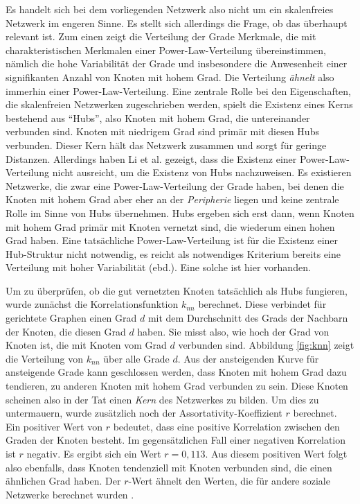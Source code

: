 Es handelt sich bei dem vorliegenden Netzwerk also nicht um ein
skalenfreies Netzwerk im engeren Sinne. Es stellt sich allerdings die
Frage, ob das überhaupt relevant ist. Zum einen zeigt die Verteilung
der Grade Merkmale, die mit charakteristischen Merkmalen einer
Power-Law-Verteilung übereinstimmen, nämlich die hohe
Variabilität der Grade und insbesondere die Anwesenheit einer
signifikanten Anzahl von Knoten mit hohem Grad. Die Verteilung
\emph{ähnelt} also immerhin einer Power-Law-Verteilung. Eine
zentrale Rolle bei den Eigenschaften, die skalenfreien Netzwerken
zugeschrieben werden, spielt die Existenz eines Kerns bestehend aus
``Hubs'', also Knoten mit hohem Grad, die untereinander verbunden
sind. Knoten mit niedrigem Grad sind primär mit diesen Hubs
verbunden. Dieser Kern hält das Netzwerk zusammen und sorgt für
geringe Distanzen. Allerdings haben Li et al. \cite{Li2005} gezeigt,
dass die Existenz einer Power-Law-Verteilung nicht ausreicht, um die
Existenz von Hubs nachzuweisen. Es existieren Netzwerke, die zwar eine
Power-Law-Verteilung der Grade haben, bei denen die Knoten mit hohem
Grad aber eher an der \emph{Peripherie} liegen und keine zentrale
Rolle im Sinne von Hubs übernehmen.  Hubs ergeben sich erst dann,
wenn Knoten mit hohem Grad primär mit Knoten vernetzt sind, die
wiederum einen hohen Grad haben. Eine tatsächliche
Power-Law-Verteilung ist für die Existenz einer Hub-Struktur nicht
notwendig, es reicht als notwendiges Kriterium bereits eine Verteilung
mit hoher Variabilität (ebd.). Eine solche ist hier vorhanden.

Um zu überprüfen, ob die gut vernetzten Knoten tatsächlich als
Hubs fungieren, wurde zunächst die Korrelationsfunktion $k_{nn}$
berechnet. Diese verbindet für gerichtete Graphen einen Grad $d$ mit
dem Durchschnitt des Grads der Nachbarn der Knoten, die diesen Grad
$d$ haben. Sie misst also, wie hoch der Grad von Knoten ist, die mit
Knoten vom Grad $d$ verbunden sind. Abbildung \ref{fig:knn} zeigt die
Verteilung von $k_{nn}$ über alle Grade $d$. Aus der ansteigenden
Kurve für ansteigende Grade kann geschlossen werden, dass Knoten mit
hohem Grad dazu tendieren, zu anderen Knoten mit hohem Grad verbunden
zu sein. Diese Knoten scheinen also in der Tat einen \emph{Kern} des
Netzwerkes zu bilden. Um dies zu untermauern, wurde zusätzlich noch
der Assortativity-Koeffizient $r$ \cite{PhysRevLett.89.208701}
berechnet. Ein positiver Wert von $r$ bedeutet, dass eine positive
Korrelation zwischen den Graden der Knoten besteht. Im
gegensätzlichen Fall einer negativen Korrelation ist $r$ negativ. Es
ergibt sich ein Wert $r = 0,113$. Aus diesem positiven Wert folgt also
ebenfalls, dass Knoten tendenziell mit Knoten verbunden sind, die
einen ähnlichen Grad haben. Der $r$-Wert ähnelt den Werten, die
für andere soziale Netzwerke berechnet wurden \cite{newman:167}.

